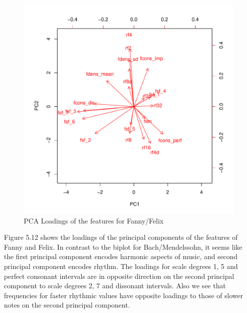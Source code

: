 \documentclass[12pt,twoside]{reedthesis}
\theoremstyle{definition}
\theoremstyle{definition}
\theoremstyle{definition}
\theoremstyle{remark}
\begin{document}
\begin{figure}[h]
\centering
\includegraphics[scale = .5]{images/biplot_f.pdf}
\caption{PCA Loadings of the features for Fanny/Felix}
\label{subd}
\end{figure}
Figure 5.12 shows the loadings of the principal components of the
features of Fanny and Felix. In contrast to the biplot for
Bach/Mendelssohn, it seems like the first principal component encodes
harmonic aspects of music, and second principal component encodes
rhythm. The loadings for scale degrees 1, 5 and perfect consonant
intervals are in opposite direction on the second principal component to
scale degrees 2, 7 and dissonant intervals. Also we see that frequencies
for faster rhythmic values have opposite loadings to those of slower
notes on the second principal component.
\end{document}
